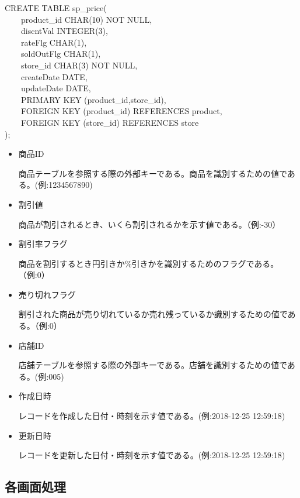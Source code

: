 \documentclass[a4j]{jarticle}
\begin{document}
\begin{screen}
  CREATE TABLE sp\_price( \\
  　　product\_id CHAR(10) NOT NULL, \\
  　　discntVal INTEGER(3), \\
  　　rateFlg CHAR(1), \\
  　　soldOutFlg CHAR(1), \\
  　　store\_id CHAR(3) NOT NULL, \\
  　　createDate DATE, \\
  　　updateDate DATE, \\
  　　PRIMARY KEY (product\_id,store\_id), \\
  　　FOREIGN KEY (product\_id) REFERENCES product, \\
  　　FOREIGN KEY (store\_id) REFERENCES store \\
  );
\end{screen}

\begin{itemize}
\item 商品ID\par
  商品テーブルを参照する際の外部キーである。商品を識別するための値である。(例:1234567890)
\item 割引値\par
  商品が割引されるとき、いくら割引されるかを示す値である。（例:-30）
\item 割引率フラグ\par
  商品を割引するとき円引きか\%引きかを識別するためのフラグである。（例:0）
\item 売り切れフラグ\par
  割引された商品が売り切れているか売れ残っているか識別するための値である。（例:0）
\item 店舗ID\par
  店舗テーブルを参照する際の外部キーである。店舗を識別するための値である。(例:005)
\item 作成日時\par
  レコードを作成した日付・時刻を示す値である。(例:2018-12-25 12:59:18)
\item 更新日時\par
  レコードを更新した日付・時刻を示す値である。(例:2018-12-25 12:59:18)
\end{itemize}


\subsection{各画面処理}
\end{document}
